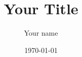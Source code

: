 \documentclass[a4paper]{./DocumentClass/MasterThesis}
\title{Your Title}
\author{Your name}
\date{\today}
\begin{document}

\frontmatter

\mktitle



% 



% 

\newpage
\tableofcontents

\newpage
\listoffigures
\newpage
\listoftables


\mainmatter





\newpage


\appendix           %



\end{document}

